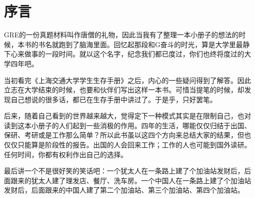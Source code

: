 \chapter*{序言}
\pagestyle{plain}

GRE的一份真题材料叫作唐僧的礼物，因此当我有了整理一本小册子的想法的时候，本书的书名就跑到了脑海里面。回忆起那段和G奋斗的时光，算是大学里最静下心来做事的一段时间。就以这个名字，纪念我们都已度过，你们也终将度过的大学四年吧。\par
当初看完《上海交通大学学生生存手册》之后，内心的一些疑问得到了解答。因此立志在大学结束的时候，也要和伙伴们写出这样一本书。可惜当提笔的时候，却发现自己想说的很多话，都已在生存手册中讲过了。于是乎，只好罢笔。\par
后来，随着自己看到的世界越来越大，觉得定下一种模式其实是在限制自己，也对读到这本小册子的人们起到一些消极的作用。四年的生活，哪能仅仅归结于出国、保研、考研或是工作那么简单？所以此书虽以这四个方向来总结大家的结果，但也仅仅只能算是阶段性的报告。出国的人会回来工作；工作的人也可能到国外读研。任何时间，你都有权利作出自己的选择。\par
最后讲一个不是很好笑的笑话吧：一个犹太人在一条路上建了个加油站发财后，后面跟来的犹太人建了理发店、餐厅、洗车房。一个中国人在一条路上建了个加油站发财后，后面跟来的中国人建了第二个加油站、第三个加油站、第四个加油站。